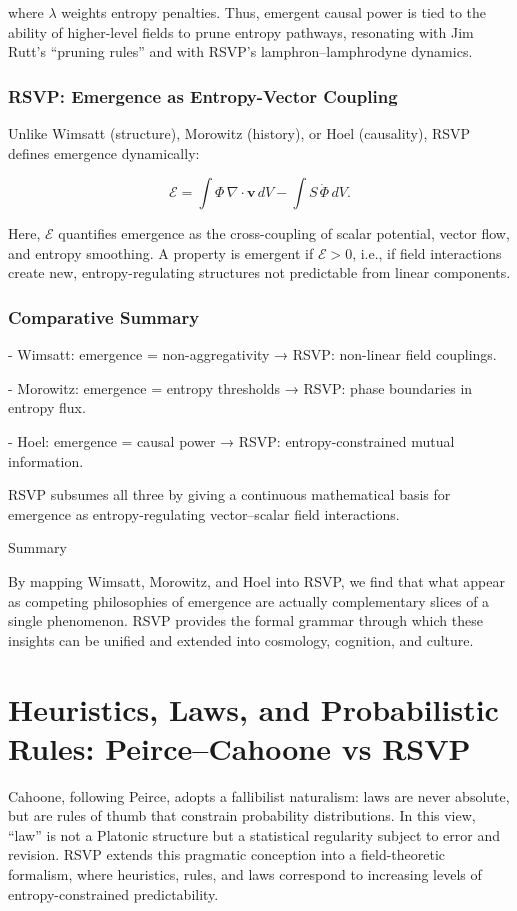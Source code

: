 \documentclass[12pt]{book}
\begin{document}
where \( \lambda \) weights entropy penalties. Thus, emergent causal power is tied to the ability of higher-level fields to prune entropy pathways, resonating with Jim Rutt’s “pruning rules” and with RSVP’s lamphron–lamphrodyne dynamics.

\subsection{RSVP: Emergence as Entropy-Vector Coupling}
Unlike Wimsatt (structure), Morowitz (history), or Hoel (causality), RSVP defines emergence dynamically:

\[ \mathcal{E} = \int \Phi \, \nabla \cdot \mathbf{v} \, dV - \int S \, \dot{\Phi} \, dV. \]

Here, \( \mathcal{E} \) quantifies emergence as the cross-coupling of scalar potential, vector flow, and entropy smoothing. A property is emergent if \( \mathcal{E} > 0 \), i.e., if field interactions create new, entropy-regulating structures not predictable from linear components.

\subsection{Comparative Summary}
- Wimsatt: emergence = non-aggregativity → RSVP: non-linear field couplings.

- Morowitz: emergence = entropy thresholds → RSVP: phase boundaries in entropy flux.

- Hoel: emergence = causal power → RSVP: entropy-constrained mutual information.

RSVP subsumes all three by giving a continuous mathematical basis for emergence as entropy-regulating vector–scalar field interactions.

Summary

By mapping Wimsatt, Morowitz, and Hoel into RSVP, we find that what appear as competing philosophies of emergence are actually complementary slices of a single phenomenon. RSVP provides the formal grammar through which these insights can be unified and extended into cosmology, cognition, and culture.

\chapter{Heuristics, Laws, and Probabilistic Rules: Peirce–Cahoone vs RSVP}
Cahoone, following Peirce, adopts a fallibilist naturalism: laws are never absolute, but are rules of thumb that constrain probability distributions. In this view, “law” is not a Platonic structure but a statistical regularity subject to error and revision. RSVP extends this pragmatic conception into a field-theoretic formalism, where heuristics, rules, and laws correspond to increasing levels of entropy-constrained predictability.
\end{document}
